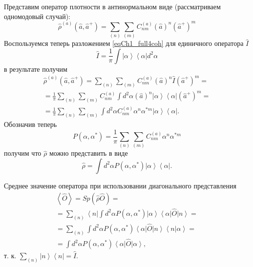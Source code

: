Представим оператор плотности в
антинормальном виде (рассматриваем одномодовый случай): 
\begin{equation}
\hat{\rho}^{\left(a\right)}\left(\hat{a},\hat{a}^{+}\right) = 
\sum_{(n)}\sum_{(m)}C^{\left(a\right)}_{nm}\left(\hat{a}\right)^n\left(\hat{a}^{+}\right)^m
\end{equation}
Воспользуемся теперь разложением \eqref{eqCh1_full4coh} для единичного
оператора $\hat{I}$
\[
\hat{I} = \frac{1}{\pi}\int \left|\alpha\right>\left<\alpha\right| d^2 \alpha
\]
в результате получим
\begin{eqnarray}
\hat{\rho}^{\left(a\right)}\left(\hat{a},\hat{a}^{+}\right) = 
\sum_{(n)}\sum_{(m)}C^{\left(a\right)}_{nm}\left(\hat{a}\right)^n\hat{I}\left(\hat{a}^{+}\right)^m
= 
\nonumber \\
= \frac{1}{\pi}\sum_{(n)}\sum_{(m)}C^{\left(a\right)}_{nm}\int d^2 \alpha
\left(\hat{a}\right)^n
\left|\alpha\right>\left<\alpha\right|
\left(\hat{a}^{+}\right)^m = 
\nonumber \\
= \frac{1}{\pi}\sum_{(n)}\sum_{(m)}\int d^2 \alpha
C^{\left(a\right)}_{nm}
\alpha^n
\alpha^{*m}
\left|\alpha\right>\left<\alpha\right|.
\end{eqnarray}
Обозначив теперь 
\[
P\left(\alpha, \alpha^{*}\right) = \frac{1}{\pi}\sum_{(n)}\sum_{(m)}
C^{\left(a\right)}_{nm}
\alpha^n
\alpha^{*m}
\]
получим что $\hat{\rho}$ можно представить в виде
\begin{equation}
\hat{\rho} = \int d^2 \alpha P\left(\alpha, \alpha^{*}\right) 
\left|\alpha\right>\left<\alpha\right|.
\label{eqCh1_Rho_in_alpha}
\end{equation}

Среднее значение оператора при использовании
диагонального представления 
\begin{eqnarray}
\left<\hat{O}\right> = Sp \left(\hat{\rho}\hat{O}\right) =
\nonumber \\
= \sum_{(n)}\left<n\right|
\int d^2 \alpha P\left(\alpha, \alpha^{*}\right) 
\left|\alpha\right>\left<\alpha\right|
\hat{O}\left|n\right> =
\nonumber \\
= \sum_{(n)} \int d^2 \alpha P\left(\alpha, \alpha^{*}\right)
\left<\alpha\right|\hat{O}\left|n\right>
\left<n\right|\left.\alpha\right> = 
\nonumber \\
=  
\int d^2 \alpha P\left(\alpha, \alpha^{*}\right)
\left<\alpha\right|\hat{O}\left|\alpha\right>,
\label{eqCh1_middleO}
\end{eqnarray}
т. к. $\sum_{(n)}\left|n\right>\left<n\right| = \hat{I}$. 

